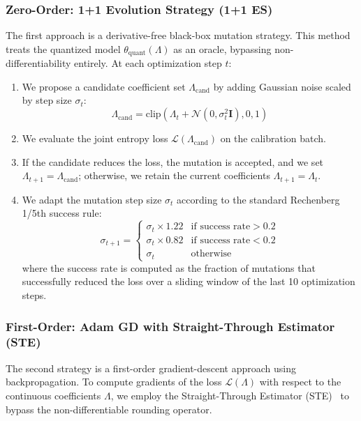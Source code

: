 \subsubsection{Zero-Order: 1+1 Evolution Strategy (1+1 ES)}
The first approach is a derivative-free black-box mutation strategy. This method treats the quantized model $\theta_{\text{quant}}(\Lambda)$ as an oracle, bypassing non-differentiability entirely. At each optimization step $t$:
\begin{enumerate}
    \item We propose a candidate coefficient set $\Lambda_{\text{cand}}$ by adding Gaussian noise scaled by step size $\sigma_t$:
    \begin{equation}
        \Lambda_{\text{cand}} = \text{clip}\left(\Lambda_t + \mathcal{N}\left(0, \sigma_t^2 \mathbf{I}\right), 0, 1\right)
    \end{equation}
    \item We evaluate the joint entropy loss $\mathcal{L}(\Lambda_{\text{cand}})$ on the calibration batch.
    \item If the candidate reduces the loss, the mutation is accepted, and we set $\Lambda_{t+1} = \Lambda_{\text{cand}}$; otherwise, we retain the current coefficients $\Lambda_{t+1} = \Lambda_t$.
    \item We adapt the mutation step size $\sigma_t$ according to the standard Rechenberg 1/5th success rule:
    \begin{equation}
        \sigma_{t+1} = \begin{cases}
            \sigma_t \times 1.22 & \text{if success rate} > 0.2 \\
            \sigma_t \times 0.82 & \text{if success rate} < 0.2 \\
            \sigma_t & \text{otherwise}
        \end{cases}
    \end{equation}
    where the success rate is computed as the fraction of mutations that successfully reduced the loss over a sliding window of the last 10 optimization steps.
\end{enumerate}

\subsubsection{First-Order: Adam GD with Straight-Through Estimator (STE)}
\label{subsec:first_order_ste}
The second strategy is a first-order gradient-descent approach using backpropagation. To compute gradients of the loss $\mathcal{L}(\Lambda)$ with respect to the continuous coefficients $\Lambda$, we employ the Straight-Through Estimator (STE)~\cite{bengio2013estimating} to bypass the non-differentiable rounding operator.

